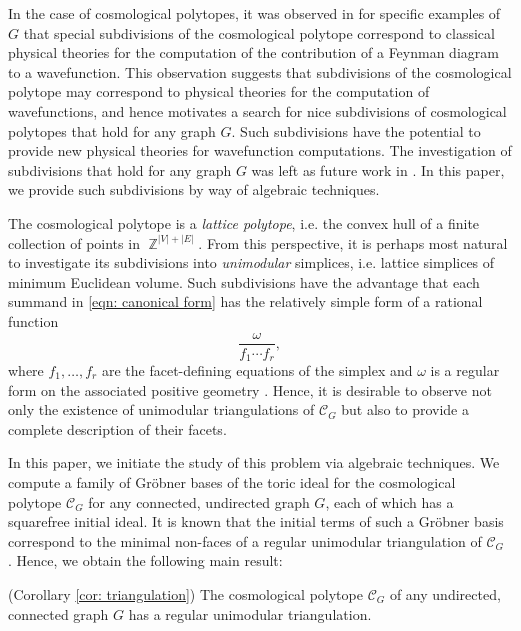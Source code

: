 \documentclass[11pt]{article}
\theoremstyle{definition}
\numberwithin{equation}{section}
\DeclareMathOperator{\ZZ}{\mathbb{Z}}
\begin{document}
In the case of cosmological polytopes, it was observed in \cite{arkani2017cosmological} for specific examples of $G$ that special subdivisions of the cosmological polytope correspond to classical physical theories for the computation of the contribution of a Feynman diagram to a wavefunction.
This observation suggests that subdivisions of the cosmological polytope may correspond to physical theories for the computation of wavefunctions, and hence motivates a search for nice subdivisions of cosmological polytopes that hold for any graph $G$.  
Such subdivisions have the potential to provide new physical theories for wavefunction computations. 
The investigation of subdivisions that hold for any graph $G$ was left as future work in \cite{arkani2017cosmological}.
In this paper, we provide such subdivisions by way of algebraic techniques.

The cosmological polytope is a \emph{lattice polytope}, i.e. the convex hull of a finite collection of points in $\ZZ^{|V|+|E|}$. 
From this perspective, it is perhaps most natural to investigate its subdivisions into \emph{unimodular} simplices, i.e. lattice simplices of minimum Euclidean volume. 
Such subdivisions have the advantage that each summand in \eqref{eqn: canonical form} has the relatively simple form of a rational function
\begin{equation}
\label{eqn: canonical form formula}
    \frac{\omega}{f_1\cdots f_r},
\end{equation}
where $f_1,\ldots, f_r$ are the facet-defining equations of the simplex and $\omega$ is a regular form on the associated positive geometry \cite{arkani2015positive}. 
Hence, it is desirable to observe not only the existence of unimodular triangulations of $\mathcal{C}_G$ but also to provide a complete description of their facets. 

In this paper, we initiate the study of this problem via algebraic techniques. 
We compute a family of Gr\"obner bases of the toric ideal for the cosmological polytope $\mathcal{C}_G$ for any connected, undirected graph $G$, each of which has a squarefree initial ideal. 
It is known that the initial terms of such a Gr\"obner basis correspond to the minimal non-faces of a regular unimodular triangulation of $\mathcal{C}_G$ \cite{sturmfels1996grobner}. 
Hence, we obtain the following main result:
\begin{thmx} (Corollary \ref{cor: triangulation})
    \label{thm: main}
    The cosmological polytope $\mathcal{C}_G$ of any undirected, connected graph $G$ has a regular unimodular triangulation. 
\end{thmx}
\end{document}
